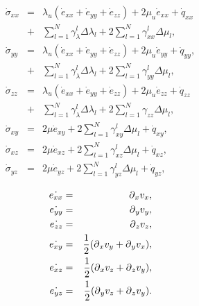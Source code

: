 \documentclass[11pt]{article}
\begin{document}
\begin{eqnarray}
  \dot{\sigma}_{xx} 
    & = & \lambda_u \left (\dot{e}_{xx} + \dot{e}_{yy} + \dot{e}_{zz}\right)
         + 2\mu_u \dot{e}_{xx} +\dot{q}_{xx}                 \nonumber\\
    & + & \sum_{l=1}^N\gamma^l_{\lambda}\Delta\lambda_l  
         + 2\sum_{l=1}^N\gamma^l_{xx}\Delta\mu_l,            \nonumber\\
  \dot{\sigma}_{yy} 
    & = & \lambda_u 
         \left (\dot{e}_{xx} + \dot{e}_{yy} + \dot{e}_{zz}\right)
         + 2\mu_u \dot{e}_{yy} +\dot{q}_{yy},                     \nonumber\\
    & + & \sum_{l=1}^N\gamma^l_{\lambda}\Delta\lambda_l  
         + 2\sum_{l=1}^N\gamma^l_{yy}\Delta\mu_l,                 \nonumber\\
  \dot{\sigma}_{zz} 
    & = & \lambda_u \left (\dot{e}_{xx} + \dot{e}_{yy} 
         + \dot{e}_{zz}\right)+ 2\mu_u \dot{e}_{zz} +\dot{q}_{zz} \nonumber\\
    & + & \sum_{l=1}^N\gamma^l_{\lambda}\Delta\lambda_l  
         + 2\sum_{l=1}^N\gamma_{zz}\Delta\mu_l,                   \nonumber\\
  \dot{\sigma}_{xy} 
    & = & 2\mu \dot{e}_{xy} + 2\sum_{l=1}^N\gamma^l_{xy}
          \Delta\mu_l+\dot{q}_{xy}                                \nonumber,\\
  \dot{\sigma}_{xz} 
    & = & 2\mu \dot{e}_{xz} + 2\sum_{l=1}^N\gamma^l_{xz}
          \Delta\mu_l+\dot{q}_{xz}                                \nonumber,\\
  \dot{\sigma}_{yz} 
    & = & 2\mu \dot{e}_{yz} + 2\sum_{l=1}^N\gamma^l_{yz}
          \Delta\mu_l+\dot{q}_{yz}                                \nonumber,\\
                 \label{eq:visco-el}
\end{eqnarray} 
\begin{eqnarray}
    \dot{e_{xx}} & = & \mbox{$\partial$}_x v_x, \nonumber\\
    \dot{e_{yy}} & = & \mbox{$\partial$}_y v_y, \nonumber\\
    \dot{e_{zz}} & = & \mbox{$\partial$}_z v_z, \nonumber\\
    \dot{e_{xy}} & = & \frac{1}{2}(\mbox{$\partial$}_x v_y + \mbox{$\partial$}_y v_x),\nonumber\\
    \dot{e_{xz}} & = & \frac{1}{2}(\mbox{$\partial$}_x v_z + \mbox{$\partial$}_z v_y),\nonumber\\
    \dot{e_{yz}} & = & \frac{1}{2}(\mbox{$\partial$}_y v_z + \mbox{$\partial$}_z v_y).\nonumber\\
\end{eqnarray}
\end{document}
